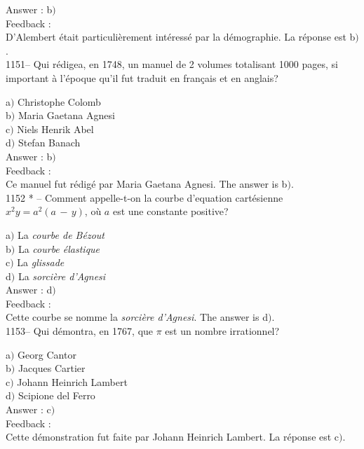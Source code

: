 ﻿\documentclass[letterpaper, 12pt]{article}
\begin{document}
Answer : b$)$\\

Feedback : \\
D'Alembert \'etait particuli\`erement int\'eress\'e par la d\'emographie. La
r\'eponse est b$)$.\\

1151-- Qui r\'edigea, en 1748, un manuel de 2 volumes totalisant
1000 pages, si important \`a l'\'epoque qu'il fut traduit en fran\c
cais et en anglais?

a$)$ Christophe Colomb \\
b$)$ Maria Gaetana Agnesi \\
c$)$ Niels Henrik Abel \\
d$)$ Stefan Banach  \\

Answer : b$)$\\

Feedback : \\
Ce manuel fut r\'edig\'e par Maria Gaetana Agnesi. The answer is b$)$.\\

1152 * -- Comment appelle-t-on la courbe d'equation cart\'esienne
$x^2y=a^2(a\,-\,y)$, o\`u $a$ est une constante positive?

a$)$ La {\sl courbe de B\'ezout} \\
b$)$ La {\sl courbe \'elastique}  \\
c$)$ La {\sl glissade} \\
d$)$ La {\sl sorci\`ere d'Agnesi}  \\

Answer : d$)$\\

Feedback : \\
Cette courbe se nomme la {\sl sorci\`ere d'Agnesi}. The answer is d$)$.\\

1153-- Qui d\'emontra, en 1767, que $\pi$ est un nombre irrationnel?

a$)$ Georg Cantor \\
b$)$ Jacques Cartier \\
c$)$ Johann Heinrich Lambert \\
d$)$ Scipione del Ferro\\

Answer : c$)$\\

Feedback : \\
Cette d\'emonstration fut faite par Johann Heinrich Lambert. La r\'eponse
est c$)$.\\
\end{document}
